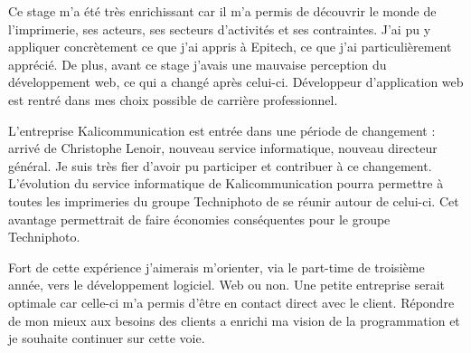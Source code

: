 \vspace*{2cm}
Ce stage m'a été très enrichissant car il m'a permis de découvrir le monde de l'imprimerie, ses acteurs, ses secteurs d'activités et ses contraintes. J'ai pu y appliquer concrètement ce que j'ai appris à Epitech, ce que j'ai particulièrement apprécié. De plus, avant ce stage j'avais une mauvaise perception du développement web, ce qui a changé après celui-ci. Développeur d'application web est rentré dans mes choix possible de carrière professionnel.\newline

L'entreprise Kalicommunication est entrée dans une période de changement : arrivé de Christophe Lenoir, nouveau service informatique, nouveau directeur général. Je suis très fier d'avoir pu participer et contribuer à ce changement. L'évolution du service informatique de Kalicommunication pourra permettre à toutes les imprimeries du groupe Techniphoto de se réunir autour de celui-ci. Cet avantage permettrait de faire économies conséquentes pour le groupe Techniphoto.\newline

Fort de cette expérience j'aimerais m'orienter, via le part-time de troisième année, vers le développement logiciel. Web ou non. Une petite entreprise serait optimale car celle-ci m'a permis d'être en contact direct avec le client. Répondre de mon mieux aux besoins des clients a enrichi ma vision de la programmation et je souhaite continuer sur cette voie.